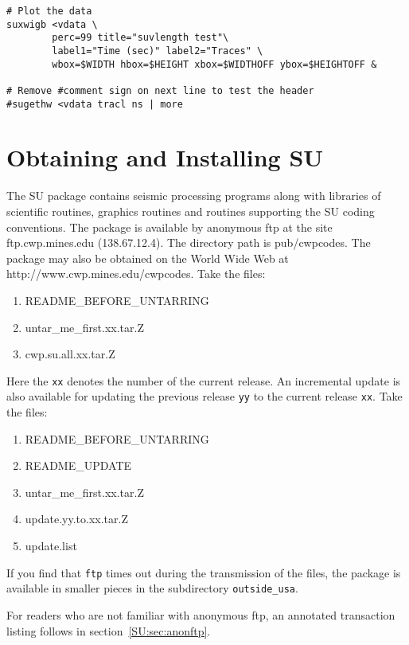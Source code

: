 {{{{{{{{\begin{verbatim}
# Plot the data 
suxwigb <vdata \
        perc=99 title="suvlength test"\
        label1="Time (sec)" label2="Traces" \
        wbox=$WIDTH hbox=$HEIGHT xbox=$WIDTHOFF ybox=$HEIGHTOFF &

# Remove #comment sign on next line to test the header
#sugethw <vdata tracl ns | more
\end{verbatim}}\noindent

\appendix
\chapter{Obtaining and Installing SU  \label{app:A}}
The {\small\sf SU} package contains seismic processing programs along with
libraries of scientific routines, graphics routines and
routines supporting the {\small\sf SU} coding conventions.
The package is available by anonymous ftp at the site
ftp.cwp.mines.edu (138.67.12.4). The directory path is pub/cwpcodes.
The package may also be obtained on the World Wide Web at
http://www.cwp.mines.edu/cwpcodes.
Take the files:
\begin{enumerate}
\item README\_BEFORE\_UNTARRING
\item untar\_me\_first.xx.tar.Z
\item cwp.su.all.xx.tar.Z
\end{enumerate}
Here the {\tt xx} denotes the number of the current release.
An incremental update is also available for updating the
previous release {\tt yy} to the current release {\tt xx}.  Take the files:

\begin{enumerate}
\item README\_BEFORE\_UNTARRING
\item README\_UPDATE
\item untar\_me\_first.xx.tar.Z
\item update.yy.to.xx.tar.Z
\item update.list
\end{enumerate}

\noindent If you find that {\tt ftp} times out during the transmission of the
files, the package is available in smaller pieces in the subdirectory
{\tt outside\_usa}.

\noindent For readers who are not familiar with anonymous ftp,
an annotated transaction listing follows in section~\ref{SU:sec:anonftp}.

}}}}}}}
